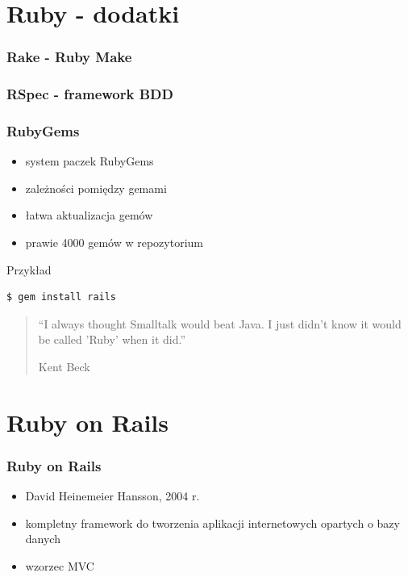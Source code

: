 \documentclass[12t]{beamer}
\begin{document}
\section{Ruby - dodatki}
\begin{frame}[fragile]
  \frametitle{Rake - Ruby Make}
  \begin{footnotesize}
    
  \end{footnotesize}
\end{frame}

\begin{frame}[fragile]
  \frametitle{RSpec - framework BDD}
  \begin{footnotesize}
    
  \end{footnotesize}
\end{frame}

\begin{frame}[fragile]
  \frametitle{RubyGems}
  \begin{itemize}
  \item system paczek RubyGems
  \item zależności pomiędzy gemami
  \item łatwa aktualizacja gemów
  \item prawie 4000 gemów w repozytorium
  \end{itemize}
  \begin{block}{Przykład}
\begin{verbatim}
$ gem install rails
\end{verbatim}
  \end{block}
\end{frame}

\begin{frame}
  \begin{quote}
    “I always thought Smalltalk would beat Java. I just
    didn't know it would be called 'Ruby' when it did.”

    \hfill Kent Beck
  \end{quote}
\end{frame}

\section{Ruby on Rails}
\begin{frame}
  \frametitle{Ruby on Rails}
  \begin{itemize}
  \item David Heinemeier Hansson, 2004 r.
  \item kompletny framework do tworzenia aplikacji internetowych
    opartych o bazy danych
  \item wzorzec MVC
  \end{itemize}
\end{frame}
\end{document}

